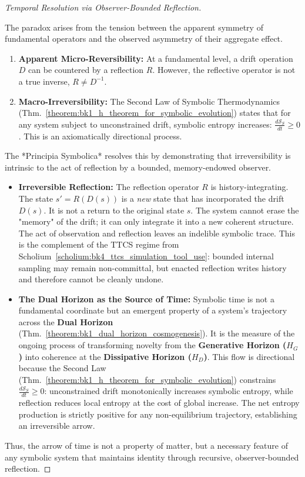 \begin{proof}[Temporal Resolution via Observer-Bounded Reflection]
\label{proof:bk4_temporal_resolution_via_observer_bounded_reflection}
\leavevmode

The paradox arises from the tension between the apparent symmetry of fundamental operators and the observed asymmetry of their aggregate effect.
\begin{enumerate}
    \item \textbf{Apparent Micro-Reversibility:} At a fundamental level, a drift operation $D$ can be countered by a reflection $R$. However, the reflective operator is not a true inverse, $R \neq D^{-1}$.
    \item \textbf{Macro-Irreversibility:} The Second Law of Symbolic Thermodynamics (Thm.~\ref{theorem:bk1_h_theorem_for_symbolic_evolution}) states that for any system subject to unconstrained drift, symbolic entropy increases: $\frac{d\mathcal{S}_S}{dt} \geq 0$. This is an axiomatically directional process.
\end{enumerate}
The *Principia Symbolica* resolves this by demonstrating that irreversibility is intrinsic to the act of reflection by a bounded, memory-endowed observer.
\begin{itemize}
    \item \textbf{Irreversible Reflection:} The reflection operator $R$ is history-integrating. The state $s' = R(D(s))$ is a \emph{new} state that has incorporated the drift $D(s)$. It is not a return to the original state $s$. The system cannot erase the "memory" of the drift; it can only integrate it into a new coherent structure. The act of observation and reflection leaves an indelible symbolic trace. This is the complement of the TTCS regime from Scholium~\ref{scholium:bk4_ttcs_simulation_tool_use}: bounded internal sampling may remain non-committal, but enacted reflection writes history and therefore cannot be cleanly undone.
    \item \textbf{The Dual Horizon as the Source of Time:} Symbolic time is not a fundamental coordinate but an emergent property of a system's trajectory across the \textbf{Dual Horizon} (Thm.~\ref{theorem:bk1_dual_horizon_cosmogenesis}). It is the measure of the ongoing process of transforming novelty from the \textbf{Generative Horizon ($H_G$)} into coherence at the \textbf{Dissipative Horizon ($H_D$)}. This flow is directional because the Second Law (Thm.~\ref{theorem:bk1_h_theorem_for_symbolic_evolution}) constrains $\frac{d\mathcal{S}_S}{dt} \geq 0$: unconstrained drift monotonically increases symbolic entropy, while reflection reduces local entropy at the cost of global increase. The net entropy production is strictly positive for any non-equilibrium trajectory, establishing an irreversible arrow.
\end{itemize}
Thus, the arrow of time is not a property of matter, but a necessary feature of any symbolic system that maintains identity through recursive, observer-bounded reflection.
\end{proof}

